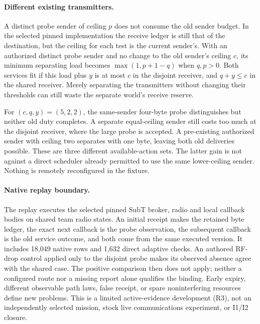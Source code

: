 \documentclass{article}
\begin{document}
\paragraph{Different existing transmitters.}
A distinct probe sender of ceiling $p$ does not consume the old
sender budget. In the selected pinned implementation the receive
ledger is still that of the destination, but the ceiling for each
test is the current sender's. With an authorized distinct probe
sender and no change to the old sender's ceiling $c$, its minimum
separating load becomes $\max(1,p+1-q)$ when $q,p>0$.
Both services fit if this load plus $y$ is at most $c$ in the disjoint
receiver, and $q+y\le c$ in the shared receiver.
Merely separating the transmitters without changing their thresholds
can still waste the separate world's receive reserve.

For $(c,q,y)=(5,2,2)$, the same-sender four-byte probe distinguishes
but neither old duty completes. A separate equal-ceiling sender
still costs too much at the disjoint receiver, where the large probe
is accepted. A pre-existing authorized sender with ceiling two
separates with one byte, leaving both old deliveries possible.
These are three different available-action sets. The latter gain
is not against a direct scheduler already permitted to use the same
lower-ceiling sender. Nothing is remotely reconfigured in the fixture.

\paragraph{Native replay boundary.}
The replay executes the selected pinned SubT broker, radio and local
callback bodies on shared team radio states. An initial receipt makes
the retained byte ledger, the exact next callback is the probe
observation, the subsequent callback is the old service outcome,
and both come from the same executed version. It includes
18,049 native rows and 1,632 direct adaptive checks. An authored
RF-drop control applied only to the disjoint probe makes its observed
absence agree with the shared case. The positive comparison then
does not apply; neither a configured route nor a missing report alone
qualifies the binding. Early expiry, different observable path laws,
false receipt, or spare noninterfering resources define new problems.
This is a limited active-evidence development (R3), not an independently
selected mission, stock live communications experiment, or I1/I2
closure.
\end{document}
